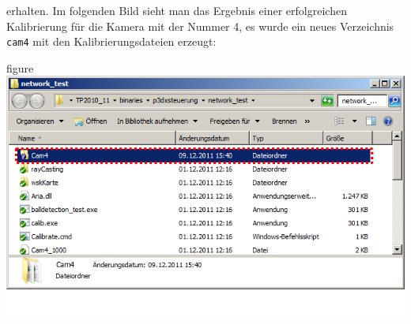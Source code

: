 \begin{itemize}
  erhalten. Im folgenden Bild sieht man das Ergebnis einer
  erfolgreichen Kalibrierung für die Kamera mit der Nummer 4, es wurde
  ein neues Verzeichnis \verb|cam4| mit den Kalibrierungsdateien erzeugt:
 \begin{nofloat}{figure}\centering
    \includegraphics[width=\linewidth]{bilder/calibrate4_red}
  \end{nofloat}
\end{itemize}
